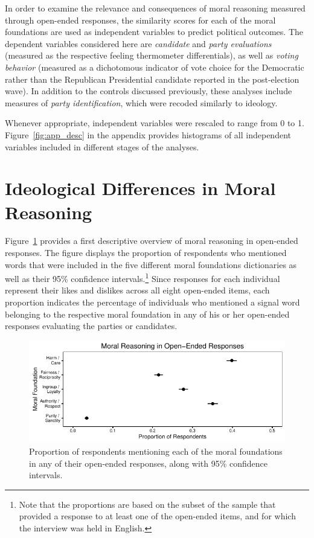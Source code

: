 \documentclass[12pt]{article}
\begin{document}
In order to examine the relevance and consequences of moral reasoning measured through open-ended responses, the similarity scores for each of the moral foundations are used as independent variables to predict political outcomes. The dependent variables considered here are \textit{candidate} and \textit{party evaluations} (measured as the respective feeling thermometer differentials), as well as \textit{voting behavior} (measured as a dichotomous indicator of vote choice for the Democratic rather than the Republican Presidential candidate reported in the post-election wave). In addition to the controls discussed previously, these analyses include measures of \textit{party identification}, which were recoded similarly to ideology.

Whenever appropriate, independent variables were rescaled to range from 0 to 1. Figure~\ref{fig:app_desc} in the appendix provides histograms of all independent variables included in different stages of the analyses.


\section*{Ideological Differences in Moral Reasoning}

Figure~\ref{fig:prop_ideol} provides a first descriptive overview of moral reasoning in open-ended responses. The figure displays the proportion of respondents who mentioned words that were included in the five different moral foundations dictionaries as well as their 95\% confidence intervals.\footnote{Note that the proportions are based on the subset of the sample that provided a response to at least one of the open-ended items, and for which the interview was held in English.} Since responses for each individual represent their likes and dislikes across all eight open-ended items, each proportion indicates the percentage of individuals who mentioned a signal word belonging to the respective moral foundation in any of his or her open-ended responses evaluating the parties or candidates.

\begin{figure}[ht]\centering
\includegraphics{../calc/fig/prop_mft.pdf}
\caption{Proportion of respondents mentioning each of the moral foundations in any of their open-ended responses, along with 95\% confidence intervals.}\label{fig:prop_ideol}
\end{figure}
\end{document}
